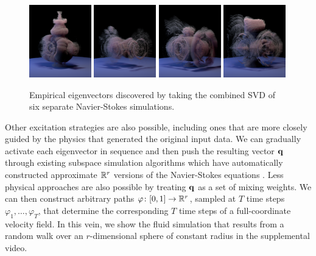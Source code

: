 \documentclass[11pt]{article}
\begin{document}
\begin{figure}
	\includegraphics[width=0.24\textwidth]{Figures/modes/plume0012.png}
	\includegraphics[width=0.24\textwidth]{Figures/modes/plume0013.png}
	\includegraphics[width=0.24\textwidth]{Figures/modes/plume0014.png}
	\includegraphics[width=0.24\textwidth]{Figures/modes/plume0015.png}
	\caption{Empirical eigenvectors discovered by taking the combined SVD of six separate Navier-Stokes simulations.}
	\label{fig:eigs}
\end{figure}

Other excitation strategies are also possible, including ones that are more closely guided by the physics that generated the original input data. We can gradually activate each eigenvector in sequence and then push the resulting vector $\mathbf{q}$ through existing subspace simulation algorithms which have automatically constructed approximate $\mathbb{R}^r$ versions of the Navier-Stokes equations \cite{Kim2013}. Less physical approaches are also possible by treating $\mathbf{q}$ as a set of mixing weights. We can then construct arbitrary paths $\varphi \colon [0, 1] \rightarrow \mathbb{R}^r$, sampled at $T$ time steps $\varphi_1, \ldots, \varphi_T$, that determine the corresponding $T$ time steps of a full-coordinate velocity field. In this vein, we show the fluid simulation that results from a random walk over an $r$-dimensional sphere of constant radius in the supplemental video. %
\end{document}

